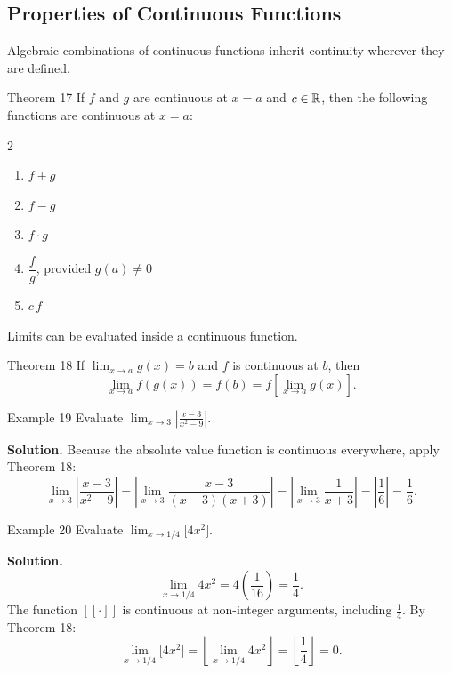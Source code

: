 \subsection*{Properties of Continuous Functions}
\label{subsec:1.5.4}


Algebraic combinations of continuous functions inherit continuity wherever they are defined.

\begin{theorembox}{Theorem 17}
If \(f\) and \(g\) are continuous at \(x = a\) and \(c \in \mathbb{R}\), then the following functions are continuous at \(x = a\):
\begin{multicols}{2}
\begin{enumerate}[nosep, topsep=0pt, itemsep=2pt]
    \item \(f + g\)
    \item \(f - g\)
    \item \(f \cdot g\)

    \columnbreak

    \item \(\dfrac{f}{g}\), provided \(g(a) \neq 0\)
    \item \(c\,f\)
\end{enumerate}
\end{multicols}
\end{theorembox}

Limits can be evaluated inside a continuous function.

\begin{theorembox}{Theorem 18}
If \(\displaystyle\lim_{x \to a} g(x) = b\) and \(f\) is continuous at \(b\), then
\[
\lim_{x \to a} f(g(x)) = f(b) = f \!\left[\lim_{x \to a} g(x)\right].
\]
\end{theorembox}

\begin{examplebox}{Example 19}
Evaluate \(\displaystyle\lim_{x \to 3} \left|\frac{x - 3}{x^{2} - 9}\right|\).

\medskip
\textbf{Solution.}
Because the absolute value function is continuous everywhere, apply Theorem 18:
\[
\lim_{x \to 3} \left|\frac{x - 3}{x^{2} - 9}\right|
    = \left|\lim_{x \to 3} \frac{x - 3}{(x - 3)(x + 3)}\right|
    = \left|\lim_{x \to 3} \frac{1}{x + 3}\right|
    = \left|\frac{1}{6}\right|
    = \frac{1}{6}.
\]
\end{examplebox}

\begin{examplebox}{Example 20}
Evaluate \(\displaystyle\lim_{x \to 1/4} \bigl[4x^{2}\bigr]\).

\medskip
\textbf{Solution.}
\[
\lim_{x \to 1/4} 4x^{2} = 4\!\left(\frac{1}{16}\right) = \frac{1}{4}.
\]
The function \([\![\cdot]\!]\) is continuous at non-integer arguments, including \(\frac{1}{4}\). By Theorem 18:
\[
\lim_{x \to 1/4} \bigl[4x^{2}\bigr]
    = \left\lfloor \lim_{x \to 1/4} 4x^{2} \right\rfloor
    = \left\lfloor \frac{1}{4} \right\rfloor
    = 0.
\]
\end{examplebox}

